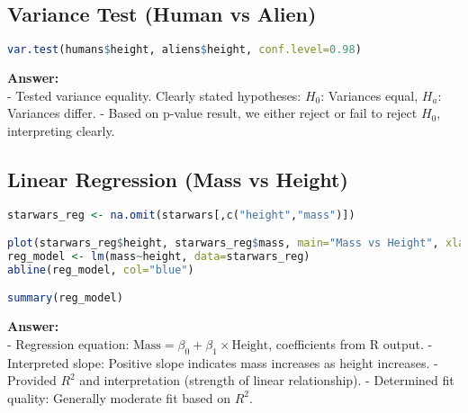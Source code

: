 \documentclass{article}
\begin{document}
\subsection*{Variance Test (Human vs Alien)}

\begin{lstlisting}[language=R]
var.test(humans$height, aliens$height, conf.level=0.98)
\end{lstlisting}

\textbf{Answer:}\\
- Tested variance equality. Clearly stated hypotheses: \(H_0\): Variances equal, \(H_a\): Variances differ.
- Based on p-value result, we either reject or fail to reject \(H_0\), interpreting clearly.

\subsection*{Linear Regression (Mass vs Height)}

\begin{lstlisting}[language=R]
starwars_reg <- na.omit(starwars[,c("height","mass")])

plot(starwars_reg$height, starwars_reg$mass, main="Mass vs Height", xlab="Height", ylab="Mass", pch=19)
reg_model <- lm(mass~height, data=starwars_reg)
abline(reg_model, col="blue")

summary(reg_model)
\end{lstlisting}

\textbf{Answer:}\\
- Regression equation: \(\text{Mass} = \beta_0 + \beta_1 \times \text{Height}\), coefficients from R output.
- Interpreted slope: Positive slope indicates mass increases as height increases.
- Provided \(R^2\) and interpretation (strength of linear relationship).
- Determined fit quality: Generally moderate fit based on \(R^2\).
\end{document}
